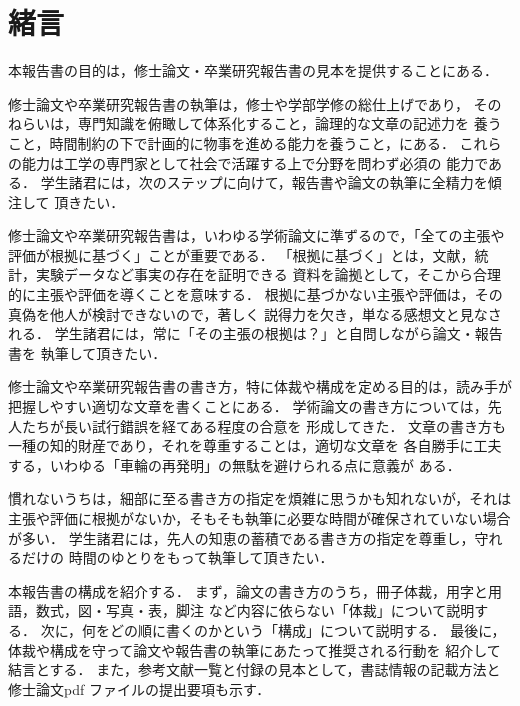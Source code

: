 \documentclass[main]{subfiles}
\begin{document}
\chapter{緒言}
本報告書の目的は，修士論文・卒業研究報告書の見本を提供することにある．

修士論文や卒業研究報告書の執筆は，修士や学部学修の総仕上げであり，
そのねらいは，専門知識を俯瞰して体系化すること，論理的な文章の記述力を
養うこと，時間制約の下で計画的に物事を進める能力を養うこと，にある．
これらの能力は工学の専門家として社会で活躍する上で分野を問わず必須の
能力である．
学生諸君には，次のステップに向けて，報告書や論文の執筆に全精力を傾注して
頂きたい．

修士論文や卒業研究報告書は，いわゆる学術論文に準ずるので，「全ての主張や
評価が根拠に基づく」ことが重要である．
「根拠に基づく」とは，文献，統計，実験データなど事実の存在を証明できる
資料を論拠として，そこから合理的に主張や評価を導くことを意味する．
根拠に基づかない主張や評価は，その真偽を他人が検討できないので，著しく
説得力を欠き，単なる感想文と見なされる．
学生諸君には，常に「その主張の根拠は？」と自問しながら論文・報告書を
執筆して頂きたい．

修士論文や卒業研究報告書の書き方，特に体裁や構成を定める目的は，読み手が
把握しやすい適切な文章を書くことにある．
学術論文の書き方については，先人たちが長い試行錯誤を経てある程度の合意を
形成してきた．
文章の書き方も一種の知的財産であり，それを尊重することは，適切な文章を
各自勝手に工夫する，いわゆる「車輪の再発明」の無駄を避けられる点に意義が
ある．


慣れないうちは，細部に至る書き方の指定を煩雑に思うかも知れないが，それは
主張や評価に根拠がないか，そもそも執筆に必要な時間が確保されていない場合
が多い．
学生諸君には，先人の知恵の蓄積である書き方の指定を尊重し，守れるだけの
時間のゆとりをもって執筆して頂きたい．


本報告書の構成を紹介する．
まず，論文の書き方のうち，冊子体裁，用字と用語，数式，図・写真・表，脚注
など内容に依らない「体裁」について説明する．
次に，何をどの順に書くのかという「構成」について説明する．
最後に，体裁や構成を守って論文や報告書の執筆にあたって推奨される行動を
紹介して結言とする．
また，参考文献一覧と付録の見本として，書誌情報の記載方法と修士論文pdf
ファイルの提出要項も示す．
\end{document}
